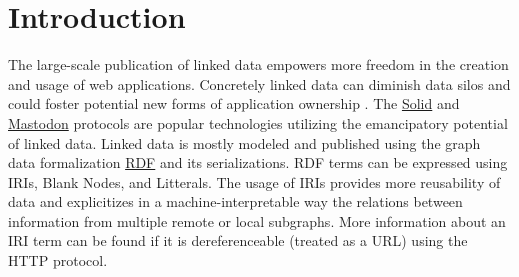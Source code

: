 \section{Introduction}
 
The large-scale publication of linked data empowers more freedom in the creation and usage of web applications.
Concretely linked data can diminish data silos \cite{Verstraete2022}
and could foster potential new forms of application ownership \cite{Mechant2021}.
The \href{https://solidproject.org/TR/protocol}{Solid} and
\href{https://docs.joinmastodon.org/}{Mastodon} protocols
are popular technologies utilizing the emancipatory potential of linked data.
Linked data is mostly modeled and published using the graph data formalization \href{https://www.w3.org/TR/rdf12-concepts/}{RDF} and its serializations.
RDF terms can be expressed using IRIs, Blank Nodes, and Litterals.
The usage of IRIs provides more reusability of data and explicitizes in a machine-interpretable way the relations between
information from multiple remote or local subgraphs.
More information about an IRI term can be found if it is dereferenceable (treated as a URL) using the HTTP protocol.


